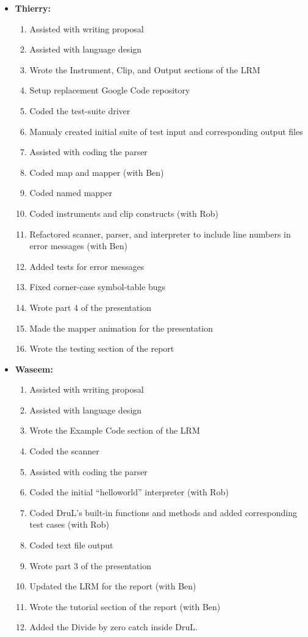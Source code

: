 \begin{itemize}
\item \textbf{Thierry:}
\begin{enumerate}
	\item Assisted with writing proposal
	\item Assisted with language design
	\item Wrote the Instrument, Clip, and Output sections of the LRM
	\item Setup replacement Google Code repository
	\item Coded the test-suite driver
	\item Manualy created initial suite of test input and corresponding output files
	\item Assisted with coding the parser
	\item Coded map and mapper (with Ben)
	\item Coded named mapper
	\item Coded instruments and clip constructs (with Rob)
	\item Refactored scanner, parser, and interpreter to include line numbers in error messages (with Ben)
	\item Added tests for error messages
	\item Fixed corner-case symbol-table bugs
	\item Wrote part 4 of the presentation
	\item Made the mapper animation for the presentation
	\item Wrote the testing section of the report
\end{enumerate}

\item \textbf{Waseem:}
\begin{enumerate}
	\item Assisted with writing proposal
	\item Assisted with language design
	\item Wrote the Example Code section of the LRM
	\item Coded the scanner
	\item Assisted with coding the parser
	\item Coded the initial ``helloworld'' interpreter (with Rob)
	\item Coded DruL's built-in functions and methods and added corresponding test cases (with Rob)
	\item Coded text file output
	\item Wrote part 3 of the presentation
	\item Updated the LRM for the report (with Ben)
	\item Wrote the tutorial section of the report (with Ben)
	\item Added the Divide by zero catch inside DruL.
\end{enumerate}

\end{itemize}

